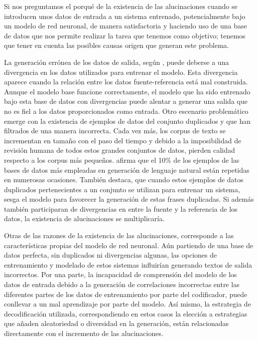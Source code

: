 Si nos preguntamos el porqué de la existencia de las alucinaciones cuando se introducen unos datos de entrada a un sistema entrenado, potencialmente bajo un modelo de red neuronal, de manera satisfactoria y haciendo uso de una base de datos que nos permite realizar la tarea que tenemos como objetivo; tenemos que tener en cuenta las posibles causas origen que generan este problema.

La generación errónea de los datos de salida, según \cite{hallucination_survey}, puede deberse a una divergencia en los datos utilizados para entrenar el modelo. Esta divergencia aparece cuando la relación entre los datos fuente-referencia está mal construida. Aunque el modelo base funcione correctamente, el modelo que ha sido entrenado bajo esta base de datos con divergencias puede alentar a generar una salida que no es fiel a los datos proporcionados como entrada. Otro escenario problemático emerge con la existencia de ejemplos de datos del conjunto duplicados y que han filtrados de una manera incorrecta. Cada vez más, los corpus de texto se incrementan en tamaño con el paso del tiempo y debido a la imposibilidad de revisión humana de todos estos grandes conjuntos de datos, pierden calidad respecto a los corpus más pequeños. \cite{lee2021deduplicating} afirma que el 10\% de los ejemplos de las bases de datos más empleadas en generación de lenguaje natural están repetidas en numerosas ocasiones. También destaca, que cuando estos ejemplos de datos duplicados pertenecientes a un conjunto se utilizan para entrenar un sistema, sesga el modelo para favorecer la generación de estas frases duplicadas. Si además también participaran de divergencias en entre la fuente y la referencia de los datos, la existencia de alucinaciones se multiplicaría.


Otras de las razones de la existencia de las alucinaciones, corresponde a las características propias del modelo de red neuronal. Aún partiendo de una base de datos perfecta, sin duplicados ni divergencias algunas, las opciones de entrenamiento y modelado de estos sistemas influirían generando textos de salida incorrectos. Por una parte, la incapacidad de comprensión del modelo de los datos de entrada debido a la generación de correlaciones incorrectas entre las diferentes partes de los datos de entrenamiento por parte del codificador, puede conllevar a un mal aprendizaje por parte del modelo. Así mismo, la estrategia de decodificación utilizada, correspondiendo en estos casos la elección a estrategias que añaden aleatoriedad o diversidad en la generación, están relacionadas directamente con el incremento de las alucinaciones.


